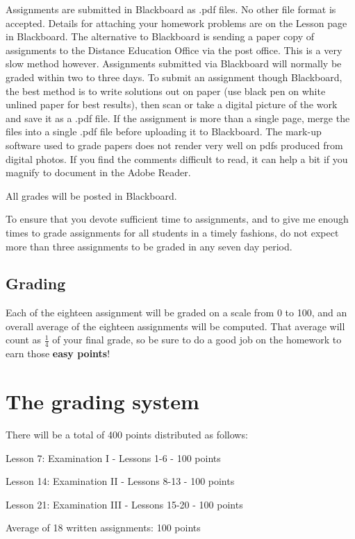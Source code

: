 \documentclass[11pt]{amsart}
\begin{document}
Assignments are submitted in Blackboard as .pdf files. No other file format is accepted.  Details for attaching your homework problems are on the Lesson page in Blackboard. The alternative to Blackboard is sending a paper copy of assignments to the Distance Education Office via the post office. This is a very slow method however. Assignments submitted via Blackboard will normally be graded within two to three days. 
 To submit an assignment though Blackboard, the best method is to write solutions out on paper (use black pen
on white  unlined paper for best results), then scan or take a digital picture of the 
work and save it  as a .pdf file. If the assignment is more than a single page, merge the files into a single .pdf file before uploading it to Blackboard. The mark-up software used to grade papers does not render very well on pdfs produced from digital photos. If you find the comments difficult to read, it can help a bit if you magnify to document in the Adobe Reader.

 All grades will be posted in Blackboard.
 
To ensure that you devote sufficient time to assignments, and to give me enough times to grade
assignments for all students in a timely fashions, do not expect more than three assignments to be
graded in any seven day period. 



\subsection{Grading} 

 Each of the eighteen assignment will be graded on a scale
from 0 to 100, and an overall average of the eighteen assignments will be
computed.  That average will count as $\frac{1}{4}$ of your final grade, so be sure
to do a good job on the homework to earn those {\bf easy points}!

\section{The grading system}

\hskip 1in There will be a total of 400 points distributed as follows:\par
\hskip 1in Lesson 7: Examination I  - Lessons 1-6 - 100 points\par
\hskip 1in Lesson 14: Examination II - Lessons 8-13 - 100 points\par
\hskip 1in Lesson 21: Examination III - Lessons 15-20 - 100 points\par
\hskip 1in Average of 18 written assignments:             100 points\bigskip
\end{document}
